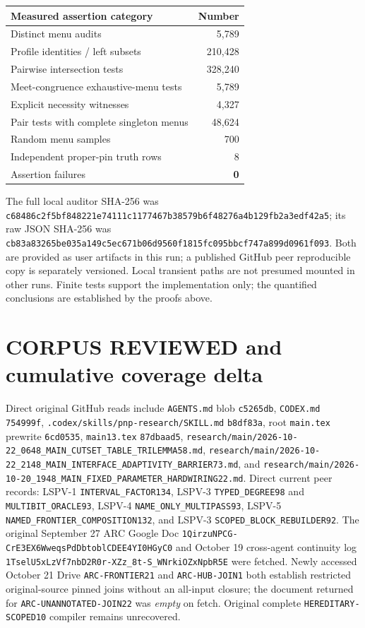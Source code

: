 \documentclass[11pt]{article}
\begin{document}
\begin{center}\small
\begin{tabular}{lr}
\toprule
Measured assertion category & Number\\\midrule
Distinct menu audits & 5,789\\
Profile identities / left subsets & 210,428\\
Pairwise intersection tests & 328,240\\
Meet-congruence exhaustive-menu tests & 5,789\\
Explicit necessity witnesses & 4,327\\
Pair tests with complete singleton menus & 48,624\\
Random menu samples & 700\\
Independent proper-pin truth rows & 8\\
Assertion failures & \textbf{0}\\
\bottomrule
\end{tabular}
\end{center}
The full local auditor SHA-256 was
\texttt{c68486c2f5bf848221e74111c1177467b38579b6f48276a4b129fb2a3edf42a5};
its raw JSON SHA-256 was
\texttt{cb83a83265be035a149c5ec671b06d9560f1815fc095bbcf747a899d0961f093}.
Both are provided as user artifacts in this run; a published
GitHub peer reproducible copy is separately versioned.
Local transient paths are not presumed mounted in other runs.
Finite tests support the implementation only; the
quantified conclusions are established by the proofs above.

\section{CORPUS REVIEWED and cumulative coverage delta}
Direct original GitHub reads include
\texttt{AGENTS.md} blob \texttt{c5265db},
\texttt{CODEX.md} \texttt{754999f},
\texttt{.codex/skills/pnp-research/SKILL.md} \texttt{b8df83a},
root \texttt{main.tex} prewrite \texttt{6cd0535},
\texttt{main13.tex} \texttt{87dbaad5},
\texttt{research/main/2026-10-22\_0648\_MAIN\_CUTSET\_TABLE\_TRILEMMA58.md},
\texttt{research/main/2026-10-22\_2148\_MAIN\_INTERFACE\_ADAPTIVITY\_BARRIER73.md},
and \texttt{research/main/2026-10-20\_1948\_MAIN\_FIXED\_PARAMETER\_HARDWIRING22.md}.
Direct current peer records: LSPV-1
\texttt{INTERVAL\_FACTOR134}, LSPV-3
\texttt{TYPED\_DEGREE98} and
\texttt{MULTIBIT\_ORACLE93}, LSPV-4
\texttt{NAME\_ONLY\_MULTIPASS93},
LSPV-5 \texttt{NAMED\_FRONTIER\_COMPOSITION132},
and LSPV-3 \texttt{SCOPED\_BLOCK\_REBUILDER92}.
The original September 27 ARC Google Doc
\texttt{1QirzuNPCG-CrE3EX6WweqsPdDbtoblCDEE4YI0HGyC0}
and October 19 cross-agent continuity log
\texttt{1TselU5xLzVf7nbD2R0r-XZz\_8t-S\_WNrkiOZxNpbR5E}
were fetched. Newly accessed October 21 Drive
\texttt{ARC-FRONTIER21} and \texttt{ARC-HUB-JOIN1}
both establish restricted original-source pinned joins
without an all-input closure; the document returned for
\texttt{ARC-UNANNOTATED-JOIN22} was \emph{empty} on fetch.
Original complete \texttt{HEREDITARY-SCOPED10} compiler
remains unrecovered.
\end{document}
